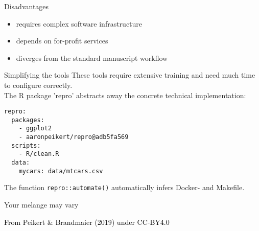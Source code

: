 \documentclass[12pt,t]{beamer}
\begin{document}
\begin{frame}[c]{Disadvantages}
\begin{itemize}
	\item requires complex software infrastructure
	\item depends on for-profit services
	\item diverges from the standard manuscript workflow
\end{itemize}
\end{frame}

\begin{frame}[c, fragile]{Simplifying the tools}
\textcolor<2->{lolit}{These tools require extensive training and need much time to configure correctly.\\}
The R package 'repro' abstracts away the concrete technical implementation:\\
\begin{lstlisting}[basicstyle=\ttfamily\scriptsize]
repro:
  packages:
    - ggplot2
    - aaronpeikert/repro@adb5fa569
  scripts:
    - R/clean.R
  data:
    mycars: data/mtcars.csv
\end{lstlisting}
The function \lstinline|repro::automate()| automatically infers Docker- and Makefile.
\end{frame}

\begin{frame}{Your melange may vary}
\end{frame}

{
  \begin{frame}[plain]
  \vspace{8cm}
  \scriptsize \hfill{}\textcolor{black}{From Peikert \& Brandmaier (2019) under CC-BY4.0}
\end{frame}
}
\end{document}
